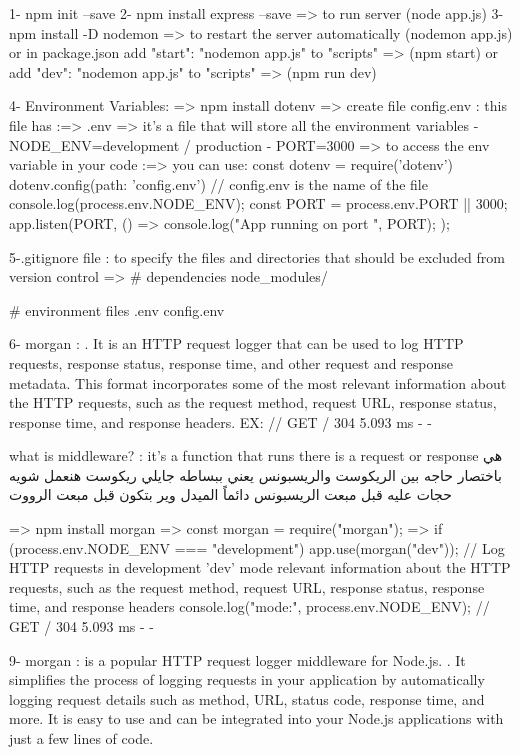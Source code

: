 
1- npm init --save
2- npm install express --save  => to run server (node app.js)
3- npm install -D nodemon => to restart the server automatically (nodemon app.js) or in  package.json add "start": "nodemon app.js" to "scripts" => (npm start) or add "dev": "nodemon app.js" to "scripts" => (npm run dev)

4- Environment  Variables:
    => npm install dotenv
    => create file config.env : this file has   
    :=> .env   => it's a file that will store all the environment variables
    - NODE_ENV=development / production
    - PORT=3000
    => to access  the env variable in your code 
        :=> you can use:
            const dotenv = require('dotenv')
            dotenv.config({path: 'config.env'})  // config.env is the name of the file
            console.log(process.env.NODE_ENV);
            const PORT = process.env.PORT || 3000;
            app.listen(PORT, () => {
                console.log("App running on  port ", PORT);
            });

5-.gitignore file : to specify the files and directories that should be excluded from version control
    => # dependencies
        node_modules/

        # environment files
        .env
        config.env

6- morgan : . It is an HTTP request logger that can be used to log HTTP requests, response status, response time, and other request and response metadata.
              This format incorporates some of the most relevant information about the HTTP requests, such as the request method, request URL, response status, response time, and response headers.
               EX: // GET / 304 5.093 ms - -

          what is middleware? :  it's a function that runs  there is a request or response
               هي باختصار حاجه بين الريكوست والريسبونس يعني ببساطه جايلي ريكوست هنعمل شويه حجات عليه قبل مبعت الريسبونس 
               دائماً الميدل وير بتكون قبل مبعت الرووت
        
        => npm install morgan
        => const morgan = require("morgan");
        => if (process.env.NODE_ENV === "development") {
                app.use(morgan("dev")); // Log HTTP requests in development 'dev' mode relevant information about the HTTP requests, such as the request method, request URL, response status, response time, and response headers
                console.log("mode:", process.env.NODE_ENV); // GET / 304 5.093 ms - -
            }

9- morgan : is a popular HTTP request logger middleware for Node.js.
            . It simplifies the process of logging requests in your application by automatically logging request details
             such as method, URL, status code, response time, and more.
             It is easy to use and can be integrated into your Node.js applications with just a few lines of code.

